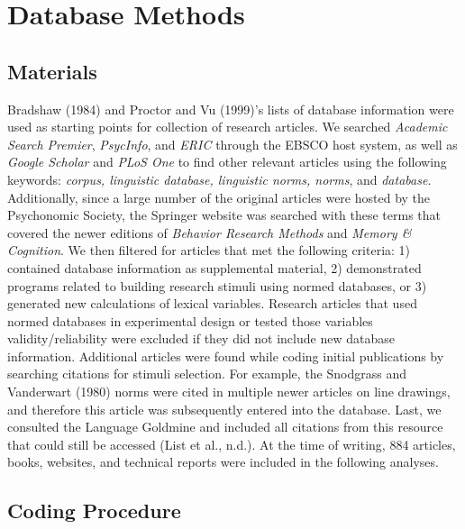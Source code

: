 \documentclass[english,,man]{apa6}
\theoremstyle{definition}
\theoremstyle{definition}
\theoremstyle{definition}
\theoremstyle{remark}
\begin{document}
\hypertarget{database-methods}{%
\section{Database Methods}\label{database-methods}}

\hypertarget{materials}{%
\subsection{Materials}\label{materials}}

Bradshaw (1984) and Proctor and Vu (1999)'s lists of database
information were used as starting points for collection of research
articles. We searched \emph{Academic Search Premier}, \emph{PsycInfo},
and \emph{ERIC} through the EBSCO host system, as well as \emph{Google
Scholar} and \emph{PLoS One} to find other relevant articles using the
following keywords: \emph{corpus, linguistic database, linguistic norms,
norms}, and \emph{database}. Additionally, since a large number of the
original articles were hosted by the Psychonomic Society, the Springer
website was searched with these terms that covered the newer editions of
\emph{Behavior Research Methods} and \emph{Memory \& Cognition}. We then
filtered for articles that met the following criteria: 1) contained
database information as supplemental material, 2) demonstrated programs
related to building research stimuli using normed databases, or 3)
generated new calculations of lexical variables. Research articles that
used normed databases in experimental design or tested those variables
validity/reliability were excluded if they did not include new database
information. Additional articles were found while coding initial
publications by searching citations for stimuli selection. For example,
the Snodgrass and Vanderwart (1980) norms were cited in multiple newer
articles on line drawings, and therefore this article was subsequently
entered into the database. Last, we consulted the Language Goldmine and
included all citations from this resource that could still be accessed
(List et al., n.d.). At the time of writing, 884 articles, books,
websites, and technical reports were included in the following analyses.

\hypertarget{coding-procedure}{%
\subsection{Coding Procedure}\label{coding-procedure}}
\end{document}

